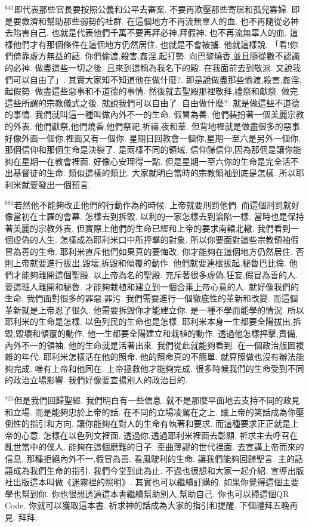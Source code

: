 \documentclass{book}
\begin{document}
$^{641}$即代表那些官長要按照公義和公平去審案.
不要再欺壓那些寄居和孤兒寡婦.
即是要救濟和幫助那些弱勢的社群.
在這個地方不再流無辜人的血.
也不再隨從必神去陷害自己.
也就是代表他們千萬不要再拜必神,拜假神.
也不再流無辜人的血.
這樣他們才有那個條件在這個地方仍然居住.
也就是不會被擄.
他就這樣說.
「看!你們倚靠虛方無益的話.
你們偷渡,殺害,姦淫,起打勢.
向巴黎燒香,並且隨從數不認識的必神.
做盡這些一切之後.
且來到這稱為我名下的殿.
在我面前去到敬派.
又說我們可以自由了」.
其實大家知不知道他在做什麼?.
即是說做盡那些偷渡,殺害,姦淫,起假勢.
做盡這些惡事和不道德的事情.
然後就去聖殿那裡敬拜,禮祭和獻祭.
做完這些所謂的宗教儀式之後.
就說我們可以自由了.
自由做什麼?.
就是做這些不道德的事情.
我們就叫這一種叫做內外不一的生命.
假冒為善.
他們裝扮著一個美麗宗教的外表.
他們獻祭,他們燒香,他們祭祀,祈禱,夜和華.
但背地裡就是做盡很多的惡事.
好像外面一個你,裡面又有一個你.
星期日回教會一個你,星期一至六是另外一個你.
那個信仰和那個生命是決裂了.
是兩樣不同的領域.
信仰歸信仰,因為那個是讓你能夠在星期一在教會裡面.
好像心安理得一點.
但是星期一至六你的生命是完全活不出基督徒的生命.
類似這樣的類比.
大家就明白當時的宗教領袖到底是怎樣.
所以耶利米就要發出一個預言.

$^{681}$若然他不能夠改正他們的行動作為的時候.
上帝就要刑罰他們.
而這個刑罰就好像當初在士羅的會幕.
怎樣去到拆毀.
以利的一家怎樣去到淪陷一樣.
當時也是保持著美麗的宗教外表.
但實際上他們的生命已經和上帝的要求南轅北轍.
我們看到一個虛偽的人生.
怎樣成為耶利米口中所抨擊的對象.
所以你要面對這些宗教領袖假冒為善的生命.
耶利米直斥他們如果真的要悔改.
你才能夠在這個地方仍然居住.
否則上帝就要進行拔出,毀壞,拆毀和傾覆的動作.
他們就要連根拔起,秘魯巴比倫.
他們才能夠離開這個聖殿.
以上帝為名的聖殿.
充斥著很多虛偽,狂妄,假冒為善的人.
要這班人離開和秘魯.
才能夠栽植和建立到一個合乘上帝心意的人.
就好像我們的生命.
我們面對很多的罪惡,罪污.
我們需要進行一個徹底性的革新和改變.
而這個革新就是上帝忍了很久.
他需要拆毀你才能建立你.
是一種不學而能學的情況.
所以耶利米的生命是怎樣.
以色列民的生命也是怎樣.
耶利米本身一生都要全陽拔出,拆毀,毀壞和傾覆的動作.
他一生都要全陽建立和栽植的動作.
透過他怎樣抨擊,責備,內外不一的領袖.
他的生命就是活著出來.
我們從此就能夠看到.
在一個政治版圖複雜的年代.
耶利米怎樣活在他的照命.
他的照命真的不簡單.
就算照做也沒有辦法能夠完成.
唯有上帝和他同在.
上帝拯救他才能夠完成.
很多時候我們的生命受到不同的政治立場影響.
我們好像要宣揚別人的政治目的.

$^{721}$但是我們回歸聖經.
我們明白有一些信息.
就不是那麼平面地去支持不同的政見和立場.
而是能夠忠於上帝的話.
在不同的立場凌駕在之上.
讓上帝的笑話成為你壓倒性的指引和方向.
讓你能夠在對人的生命有執著和要求.
而這種要求正正就是上帝的心意.
怎樣在以色列文裡面.
透過你,透過耶利米裡面去彰顯.
祈求主去呼召在亂世當中的僕人.
能夠在這個磨難的日子.
歪曲薄謬的世代裡面.
去宣講上帝而來的信息.
那種拒絕內外不一,假冒為善.
看風駛利的生命.
讓我們能夠回歸聖言.
主的話語成為我們生命的指引.
我們今堂到此為止.
不過也很想和大家一起介紹.
宣導出版社出版這本叫做《迷霧裡的照明》.
其實也可以繼續訂購的.
如果你覺得這個主要學也幫到你.
你也很想透過這本書繼續幫助別人,幫助自己.
你也可以掃這個QR Code.
你就可以獲取這本書.
祈求神的話成為大家的指引和提醒.
下個禮拜五晚再見.
拜拜.
\newpage
\end{document}
